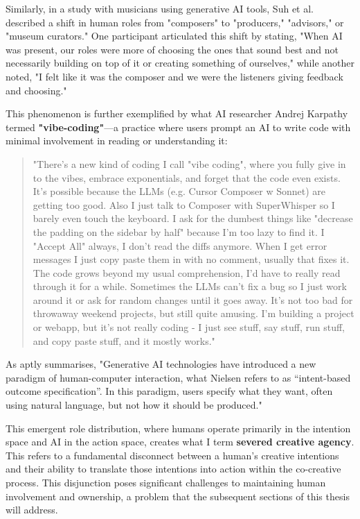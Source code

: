 Similarly, in a study with musicians using generative AI tools, Suh et al. \cite{Suh2021-cj} described a shift in human roles from "composers" to "producers," "advisors," or "museum curators." One participant articulated this shift by stating, "When AI was present, our roles were more of choosing the ones that sound best and not necessarily building on top of it or creating something of ourselves," while another noted, "I felt like it was the composer and we were the listeners giving feedback and choosing."

This phenomenon is further exemplified by what AI researcher Andrej Karpathy termed \textbf{"vibe-coding"}—a practice where users prompt an AI to write code with minimal involvement in reading or understanding it:

\begin{quote}
"There's a new kind of coding I call "vibe coding", where you fully give in to the vibes, embrace exponentials, and forget that the code even exists. It's possible because the LLMs (e.g. Cursor Composer w Sonnet) are getting too good. Also I just talk to Composer with SuperWhisper so I barely even touch the keyboard. I ask for the dumbest things like "decrease the padding on the sidebar by half" because I'm too lazy to find it. I "Accept All" always, I don't read the diffs anymore. When I get error messages I just copy paste them in with no comment, usually that fixes it. The code grows beyond my usual comprehension, I'd have to really read through it for a while. Sometimes the LLMs can't fix a bug so I just work around it or ask for random changes until it goes away. It's not too bad for throwaway weekend projects, but still quite amusing. I'm building a project or webapp, but it's not really coding - I just see stuff, say stuff, run stuff, and copy paste stuff, and it mostly works."
\end{quote}
As \cite{Weisz2024-io} aptly summarises, "Generative AI technologies have introduced a new paradigm of human-computer interaction, what Nielsen refers to as “intent-based outcome specification”. In this paradigm, users specify what they want, often using natural language, but not how it should be produced."

This emergent role distribution, where humans operate primarily in the intention space and AI in the action space, creates what I term \textbf{severed creative agency}. This refers to a fundamental disconnect between a human's creative intentions and their ability to translate those intentions into action within the co-creative process. This disjunction poses significant challenges to maintaining human involvement and ownership, a problem that the subsequent sections of this thesis will address.

